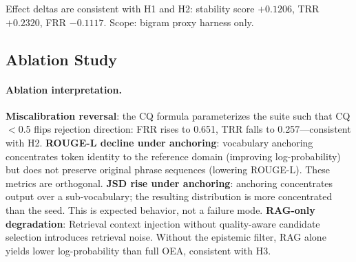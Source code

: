 \documentclass[11pt]{article}
\begin{document}
Effect deltas are consistent with H1 and H2: stability score $+0.1206$, TRR $+0.2320$, FRR $-0.1117$. Scope: bigram proxy harness only.

\subsection{Ablation Study}
\label{sec:ablation}

\paragraph{Ablation interpretation.}
\textbf{Miscalibration reversal}: the CQ formula parameterizes the suite such that CQ$<$0.5 flips rejection direction: FRR rises to 0.651, TRR falls to 0.257---consistent with H2.
\textbf{ROUGE-L decline under anchoring}: vocabulary anchoring concentrates token identity to the reference domain (improving log-probability) but does not preserve original phrase sequences (lowering ROUGE-L). These metrics are orthogonal.
\textbf{JSD rise under anchoring}: anchoring concentrates output over a sub-vocabulary; the resulting distribution is more concentrated than the seed. This is expected behavior, not a failure mode.
\textbf{RAG-only degradation}: Retrieval context injection without quality-aware candidate selection introduces retrieval noise. Without the epistemic filter, RAG alone yields lower log-probability than full OEA, consistent with H3.
\end{document}
